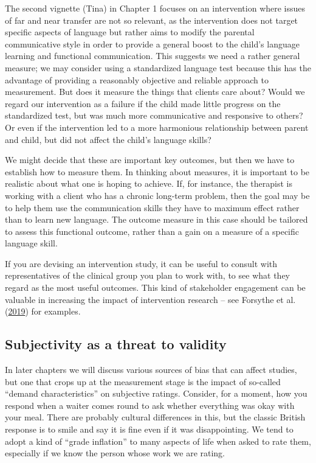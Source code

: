 \documentclass{krantz}
\begin{document}
The second vignette (Tina) in Chapter 1 focuses on an intervention where issues of far and near transfer are not so relevant, as the intervention does not target specific aspects of language but rather aims to modify the parental communicative style in order to provide a general boost to the child's language learning and functional communication. This suggests we need a rather general measure; we may consider using a standardized language test because this has the advantage of providing a reasonably objective and reliable approach to measurement. But does it measure the things that clients care about? Would we regard our intervention as a failure if the child made little progress on the standardized test, but was much more communicative and responsive to others? Or even if the intervention led to a more harmonious relationship between parent and child, but did not affect the child's language skills?

We might decide that these are important key outcomes, but then we have to establish how to measure them. In thinking about measures, it is important to be realistic about what one is hoping to achieve. If, for instance, the therapist is working with a client who has a chronic long-term problem, then the goal may be to help them use the communication skills they have to maximum effect rather than to learn new language. The outcome measure in this case should be tailored to assess this functional outcome, rather than a gain on a measure of a specific language skill.

If you are devising an intervention study, it can be useful to consult with representatives of the clinical group you plan to work with, to see what they regard as the most useful outcomes. This kind of stakeholder engagement can be valuable
 in increasing the impact of intervention research -- see Forsythe et al. (\protect\hyperlink{ref-forsythe2019}{2019}) for examples.

\hypertarget{subjectivity-as-a-threat-to-validity}{%
\subsection{Subjectivity as a threat to validity}\label{subjectivity-as-a-threat-to-validity}}

In later chapters we will discuss various sources of bias that can affect studies, but one that crops up at the measurement stage is the impact of so-called ``demand characteristics'' on subjective ratings. Consider, for a moment, how you respond when a waiter comes round to ask whether everything was okay with your meal. There are probably cultural differences in this, but the classic British response is to smile and say it is fine even if it was disappointing. We tend to adopt a kind of ``grade inflation'' to many aspects of life when asked to rate them, especially if we know the person whose work we are rating.
\end{document}
